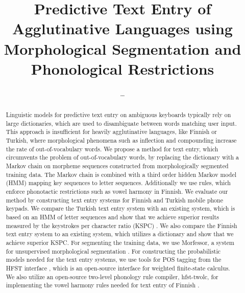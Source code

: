 \documentclass{llncs}
\begin{document}
\title{Predictive Text Entry of Agglutinative Languages using Morphological Segmentation and Phonological Restrictions}

\author{\ldots}
\institute{\ldots}

\maketitle

\begin{abstract}

Linguistic models for predictive text entry on ambiguous keyboards
typically rely on large dictionaries, which are used to disambiguate
between words matching user input. This approach is insufficient for
heavily agglutinative languages, like Finnish or Turkish, where
morphological phenomena such as inflection and compounding increase
the rate of out-of-vocabulary words. We propose a method for text
entry, which circumvents the problem of out-of-vocabulary words, by
replacing the dictionary with a Markov chain on morpheme sequences
constructed from morphologically segmented training data. The Markov
chain is combined with a third order hidden Markov model (HMM) mapping
key sequences to letter sequences. Additionally we use rules, which
enforce phonotactic restrictions such as vowel harmony in Finnish. We
evaluate our method by constructing text entry systems for Finnish and
Turkish mobile phone keypads. We compare the Turkish text entry system
with an existing system, which is based on an HMM of letter sequences
\cite{Tantug:2010} and show that we achieve superior results measured
by the keystrokes per character ratio (KSPC)
\cite{MacKenzie02kspc}. We also compare the Finnish text entry system
to an existing system, which utilizes a dictionary
\cite{silfverberg/2011/cla} and show that we achieve superior
KSPC. For segmenting the training data, we use Morfessor, a system for
unsupervised morphological segmentation \cite{Creutz07ACMTSLP}. For
constructing the probabilistic models needed for the text entry
systems, we use tools for POS tagging from the HFST interface
\cite{Silfverberg/2011}, which is an open-source interface for
weighted finite-state calculus. We also utilize an open-source
two-level phonology rule compiler, hfst-twolc, for implementing the
vowel harmony rules needed for text entry of Finnish \cite{hfst/2011}.

\end{abstract}



\end{document}
